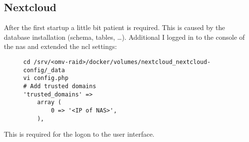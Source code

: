 

\subsection{Nextcloud}


After the first startup a little bit patient is required. This is caused by
the database installation (schema, tables, \ldots). Additional I logged in to
the console of the \gls{nas} and extended the \gls{ncl} settings:

\begin{figure}[H]
    \scriptsize
    \centering
    \begin{BVerbatim}
cd /srv/<omv-raid>/docker/volumes/nextcloud_nextcloud-config/_data
vi config.php
# Add trusted domains
'trusted_domains' =>
    array (
        0 => '<IP of NAS>',
    ),
    \end{BVerbatim}
\end{figure}

This is required for the logon to the user interface.
